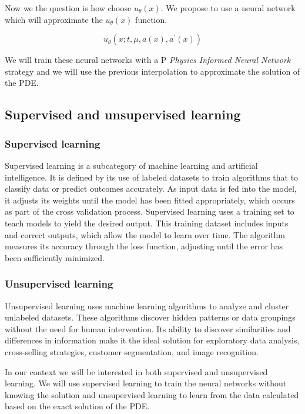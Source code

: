 \documentclass{article}
\begin{document}
Now we the question is how choose $u_\theta(x)$. We propose to use a neural network which will approximate the $u_\theta(x)$ function. 

$$
u_\theta\left(x ; t, \mu, a(x), a^{\prime}(x)\right)
$$

We will train these neural networks with a P \textit{Physics Informed Neural Network} strategy and we will use the previous interpolation to approximate the solution of the PDE.

\subsection{Supervised and unsupervised learning}

\subsubsection{Supervised learning}

Supervised learning is a subcategory of machine learning and artificial intelligence. 
It is defined by its use of labeled datasets to train algorithms that to classify data or predict outcomes accurately. As input data is fed into the model, 
it adjusts its weights until the model has been fitted appropriately, which occurs as part of the cross validation process. Supervised learning uses a training set to teach models to yield the desired output. This training dataset includes inputs and correct outputs, which allow the model to learn over time. The algorithm measures its accuracy through the loss function, 
adjusting until the error has been sufficiently minimized. 

\subsubsection{Unsupervised learning}
Unsupervised learning uses machine learning algorithms to analyze and cluster unlabeled datasets. These algorithms discover hidden patterns or data groupings without the need for human intervention. Its ability to discover similarities and differences in information make it the ideal solution for exploratory data analysis, cross-selling strategies, customer segmentation, and image recognition.


In our context we will be interested in both supervised and unsupervised learning. We will use supervised learning to train the neural networks without knowing the solution and unsupervised learning to learn from the data calculated based on the exact solution of the PDE.
\end{document}
